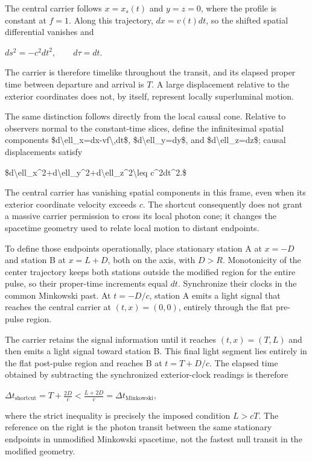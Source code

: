 \documentclass[11pt]{article}
\begin{document}
The central carrier follows $x=x_s(t)$ and $y=z=0$, where the profile is constant at $f=1$. Along this trajectory, $dx=v(t)dt$, so the shifted spatial differential vanishes and

$ds^2=-c^2dt^2,\qquad d\tau=dt.$

The carrier is therefore timelike throughout the transit, and its elapsed proper time between departure and arrival is $T$. A large displacement relative to the exterior coordinates does not, by itself, represent locally superluminal motion.

The same distinction follows directly from the local causal cone. Relative to observers normal to the constant-time slices, define the infinitesimal spatial components \$d\textbackslash{}ell\_x=dx-vf\textbackslash{},dt\$, \$d\textbackslash{}ell\_y=dy\$, and \$d\textbackslash{}ell\_z=dz\$; causal displacements satisfy

\$d\textbackslash{}ell\_x\textasciicircum{}2+d\textbackslash{}ell\_y\textasciicircum{}2+d\textbackslash{}ell\_z\textasciicircum{}2\textbackslash{}leq c\textasciicircum{}2dt\textasciicircum{}2.\$

The central carrier has vanishing spatial components in this frame, even when its exterior coordinate velocity exceeds $c$. The shortcut consequently does not grant a massive carrier permission to cross its local photon cone; it changes the spacetime geometry used to relate local motion to distant endpoints.

To define those endpoints operationally, place stationary station A at $x=-D$ and station B at $x=L+D$, both on the axis, with $D>R$. Monotonicity of the center trajectory keeps both stations outside the modified region for the entire pulse, so their proper-time increments equal $dt$. Synchronize their clocks in the common Minkowski past. At $t=-D/c$, station A emits a light signal that reaches the central carrier at $(t,x)=(0,0)$, entirely through the flat pre-pulse region.

The carrier retains the signal information until it reaches $(t,x)=(T,L)$ and then emits a light signal toward station B. This final light segment lies entirely in the flat post-pulse region and reaches B at $t=T+D/c$. The elapsed time obtained by subtracting the synchronized exterior-clock readings is therefore

$\Delta t_{\mathrm{shortcut}}=T+\frac{2D}{c}<\frac{L+2D}{c}=\Delta t_{\mathrm{Minkowski}},$

where the strict inequality is precisely the imposed condition $L>cT$. The reference on the right is the photon transit between the same stationary endpoints in unmodified Minkowski spacetime, not the fastest null transit in the modified geometry.
\end{document}

